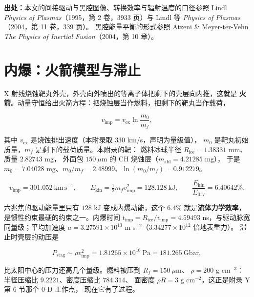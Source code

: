 {\footnotesize
\textbf{出处：}本文的间接驱动与黑腔图像、转换效率与辐射温度的口径参照
Lindl \emph{Physics of Plasmas}（1995，第 2 卷，3933 页）与 Lindl 等
\emph{Physics of Plasmas}（2004，第 11 卷，339 页）。
黑腔能量平衡的形式参照
Atzeni \& Meyer-ter-Vehn \emph{The Physics of Inertial Fusion}（2004，第 10 章）。
}

\section{内爆：火箭模型与滞止}
\label{sec:app-ai-implosion}

X 射线烧蚀靶丸外壳，外壳向外喷出的等离子体把剩下的壳层向内推，这就是
\textbf{火箭}。动量守恒给出火箭方程：把烧蚀层当作燃料，把剩下的靶丸当作载荷，

\begin{equation}
v_{\mathrm{imp}} = v_{\mathrm{ex}} \ln\frac{m_0}{m_f},
\label{eq:app-ai-rocket}
\end{equation}

其中 $v_{\mathrm{ex}}$ 是烧蚀排出速度（本附录取 $330$ km/s，声明为量级值），
$m_0$ 是靶丸初始质量，$m_f$ 是剩下的载荷质量。本附录的靶：
燃料冰球半径 $R_{\mathrm{ice}} = 1.38331$ mm、质量 $2.82743$ mg，
外面包 $150\ \mu$m 的 CH 烧蚀层（$m_{\mathrm{abl}} = 4.21285$ mg），
于是 $m_0 = 7.04028$ mg、$m_0/m_f = 2.48999$、$\ln(m_0/m_f) = 0.912279$。

\begin{equation}
v_{\mathrm{imp}} = 301.052\ \mathrm{km\,s^{-1}},
\qquad
E_{\mathrm{kin}} = \tfrac12 m_f v_{\mathrm{imp}}^2 = 128.128\ \mathrm{kJ},
\qquad
\frac{E_{\mathrm{kin}}}{E_{\mathrm{drv}}} = 6.40642\%.
\label{eq:app-ai-ekin}
\end{equation}

六兆焦的驱动能量里只有 $128$ kJ 变成内爆动能，这个 $6.4\%$ 就是\textbf{流体力学效率}，
是惯性约束最硬的约束之一。内爆时间 $t_{\mathrm{imp}} = R_{\mathrm{ice}}/v_{\mathrm{imp}}
= 4.59493$ ns，与驱动脉宽同量级；平均加速度
$a = 3.27591\times10^{13}$ m s$^{-2}$（$3.34277\times10^{12}$ 倍地表重力）。
滞止时壳层的动压是

\begin{equation}
P_{\mathrm{stag}} \sim \rho v_{\mathrm{imp}}^2 = 1.81265\times10^{16}\ \mathrm{Pa}
= 181.265\ \mathrm{Gbar},
\label{eq:app-ai-stag}
\end{equation}

比太阳中心的压力还高几个量级。燃料被压到 $R_f = 150\ \mu$m、
$\rho = 200$ g cm$^{-3}$：半径压缩比 $9.2221$、密度压缩比 $784.314$、
面密度 $\rho R = 3$ g cm$^{-2}$，这正是附录 Y 第 6 节那个 0-D 工作点，
现在它有了过程。

